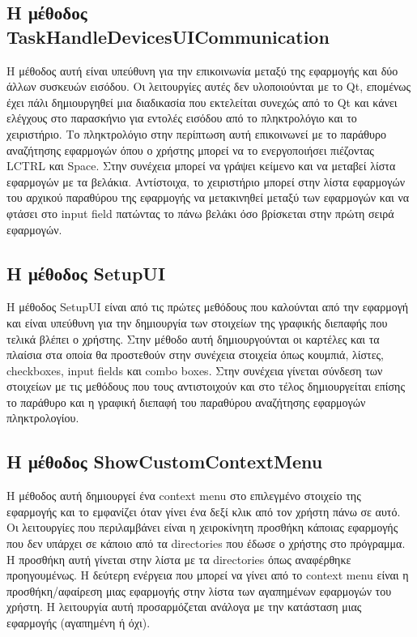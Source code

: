 \subsection{Η μέθοδος TaskHandleDevicesUICommunication}
Η μέθοδος αυτή είναι υπεύθυνη για την επικοινωνία μεταξύ της εφαρμογής και δύο άλλων συσκευών εισόδου.
Οι λειτουργίες αυτές δεν υλοποιούνται με το Qt, επομένως έχει πάλι δημιουργηθεί μια διαδικασία που
εκτελείται συνεχώς από το Qt και κάνει ελέγχους στο παρασκήνιο για εντολές εισόδου από το πληκτρολόγιο
και το χειριστήριο. Το πληκτρολόγιο στην περίπτωση αυτή επικοινωνεί με το παράθυρο αναζήτησης εφαρμογών
όπου ο χρήστης μπορεί να το ενεργοποιήσει πιέζοντας LCTRL και Space. Στην συνέχεια μπορεί να γράψει κείμενο
και να μεταβεί λίστα εφαρμογών με τα βελάκια. Αντίστοιχα, το χειριστήριο μπορεί στην λίστα εφαρμογών του
αρχικού παραθύρου της εφαρμογής να μετακινηθεί μεταξύ των εφαρμογών και να φτάσει στο input field πατώντας
το πάνω βελάκι όσο βρίσκεται στην πρώτη σειρά εφαρμογών.


\subsection{Η μέθοδος SetupUI}
Η μέθοδος SetupUI είναι από τις πρώτες μεθόδους που καλούνται από την εφαρμογή και
είναι υπεύθυνη για την δημιουργία των στοιχείων της γραφικής διεπαφής που τελικά
βλέπει ο χρήστης. Στην μέθοδο αυτή δημιουργούνται οι καρτέλες και τα πλαίσια στα
οποία θα προστεθούν στην συνέχεια στοιχεία όπως κουμπιά, λίστες, checkboxes, input
fields και combo boxes. Στην συνέχεια γίνεται σύνδεση των στοιχείων με τις μεθόδους
που τους αντιστοιχούν και στο τέλος δημιουργείται επίσης το παράθυρο και η γραφική
διεπαφή του παραθύρου αναζήτησης εφαρμογών πληκτρολογίου.



\subsection{Η μέθοδος ShowCustomContextMenu}
Η μέθοδος αυτή δημιουργεί ένα context menu στο επιλεγμένο στοιχείο της εφαρμογής και
το εμφανίζει όταν γίνει ένα δεξί κλικ από τον χρήστη πάνω σε αυτό. Οι λειτουργίες που
περιλαμβάνει είναι η χειροκίνητη προσθήκη κάποιας εφαρμογής που δεν υπάρχει σε κάποιο
από τα directories που έδωσε ο χρήστης στο πρόγραμμα. Η προσθήκη αυτή γίνεται στην
λίστα με τα directories όπως αναφέρθηκε προηγουμένως. Η δεύτερη ενέργεια που μπορεί
να γίνει από το context menu είναι η προσθήκη/αφαίρεση μιας εφαρμογής στην λίστα των
αγαπημένων εφαρμογών του χρήστη. Η λειτουργία αυτή προσαρμόζεται ανάλογα με την κατάσταση
μιας εφαρμογής (αγαπημένη ή όχι).

